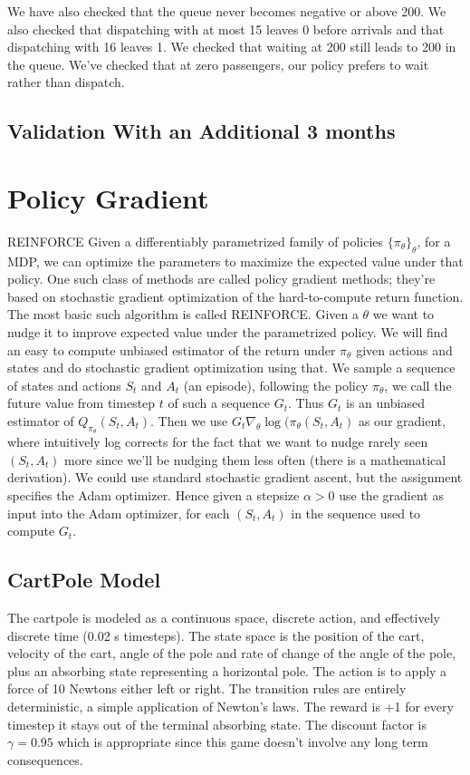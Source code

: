 \documentclass{article}
\begin{document}
We have also checked that the queue never becomes negative or above 200. We also checked that dispatching with at most 15 leaves 0 before arrivals and that dispatching with 16 leaves 1. We checked that waiting at 200 still leads to 200 in the queue. We've checked that at zero passengers, our policy prefers to wait rather than dispatch.

\subsection{Validation With an Additional 3 months}

\section{Policy Gradient}
{REINFORCE}
Given a differentiably parametrized family of policies $\{ \pi_\theta\}_\theta$, for a MDP, we can optimize the parameters to maximize the expected value under that policy. One such class of methods are called policy gradient methods; they're based on stochastic gradient optimization of the hard-to-compute return function. The most basic such algorithm is called REINFORCE. Given a $\theta$ we want to nudge it to improve expected value under the parametrized policy. We will find an easy to compute unbiased estimator of the return under $\pi_\theta$ given actions and states and do stochastic gradient optimization using that. We sample a sequence of states and actions $S_t$ and $A_t$ (an episode), following the policy $\pi_\theta$, we call the future value from timestep $t$ of such a sequence $G_t$. Thus $G_t$ is an unbiased estimator of $Q_{\pi_\theta}(S_t, A_t)$. Then we use $G_t \nabla_\theta \log(\pi_\theta(S_t, A_t)$ as our gradient, where intuitively log corrects for the fact that we want to nudge rarely seen $(S_t,A_t)$ more since we'll be nudging them less often (there is a mathematical derivation). We could use standard stochastic gradient ascent, but the assignment specifies the Adam optimizer. Hence given a stepsize $\alpha > 0$ use the gradient as input into the Adam optimizer, for each $(S_t,A_t)$ in the sequence used to compute $G_t$.
\subsection{CartPole Model}
The cartpole is modeled as a continuous space, discrete action, and effectively discrete time (0.02 s timesteps). The state space is the position of the cart, velocity of the cart, angle of the pole and rate of change of the angle of the pole, plus an absorbing state representing a horizontal pole. The action is to apply a force of 10 Newtons either left or right. The transition rules are entirely deterministic, a simple application of Newton's laws. The reward is +1 for every timestep it stays out of the terminal absorbing state. The discount factor is $\gamma = 0.95$ which is appropriate since this game doesn't involve any long term consequences.
\end{document}
